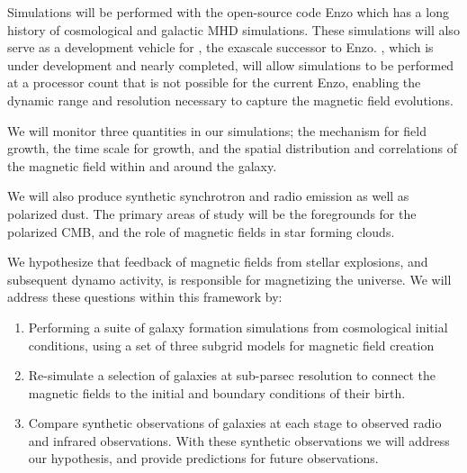 
Simulations will be performed with the open-source code Enzo
\citep{Collins10,2014ApJS..211...19B} which has a long history of
cosmological and galactic MHD simulations.   These simulations will also serve as a development vehicle for 
\enzoe, the exascale successor to Enzo.  \enzoe, which is under development and
nearly completed, will allow simulations to be performed at a processor count
that is not possible for the current Enzo, 
enabling the dynamic range and resolution necessary to capture the
magnetic field evolutions.

We will monitor three quantities in our simulations; the mechanism for field
growth, the time scale for growth, and the spatial distribution and correlations
of the magnetic field within and around the galaxy.   

We will also produce
synthetic synchrotron and radio emission as well as polarized dust.    The
primary areas of study will be the foregrounds for the polarized CMB, and the
role of magnetic fields in star forming clouds.


We hypothesize that feedback of magnetic fields from
stellar explosions, and subsequent dynamo activity, is responsible for
magnetizing the universe.  We will address these questions within this
framework by:
\vspace{-2mm}
\begin{enumerate}

\item Performing a suite of galaxy formation simulations from cosmological
initial conditions, using a set of three subgrid models for magnetic field
creation
\item Re-simulate a selection of galaxies at sub-parsec resolution to connect the
magnetic fields to the initial and boundary conditions of their birth.
\item Compare synthetic observations of galaxies at each stage to observed radio
and infrared observations.  With these synthetic observations we will address
our hypothesis, and provide predictions for future observations.

\end{enumerate}
\vspace{-2mm}

